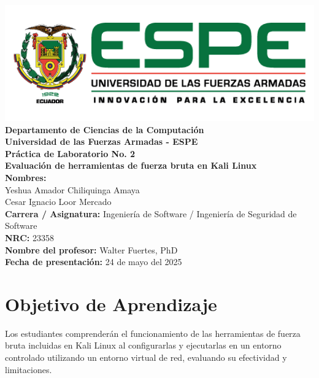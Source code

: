 \documentclass[12pt,a4paper]{article}
\begin{document}
\begin{titlepage}
    \centering
    \vspace*{1cm}
    \includegraphics[width=0.8\linewidth]{espe.png}\\[0.5cm]
    
    \Large \textbf{Departamento de Ciencias de la Computación}\\
    \large \textbf{Universidad de las Fuerzas Armadas - ESPE}\\[0.5cm]
    
    \Huge \textbf{Práctica de Laboratorio No. 2}\\[0.3cm]
    \Large \textbf{Evaluación de herramientas de fuerza bruta en Kali Linux}\\[0.8cm]
    
    \textbf{Nombres:}\\
    Yeshua Amador Chiliquinga Amaya\\
    Cesar Ignacio Loor Mercado\\[0.3cm]
    
    \textbf{Carrera / Asignatura:} Ingeniería de Software / Ingeniería de Seguridad de Software\\
    \textbf{NRC:} 23358\\
    \textbf{Nombre del profesor:} Walter Fuertes, PhD\\[0.5cm]
    
    \textbf{Fecha de presentación:} 24 de mayo del 2025\\[1cm]    
    \vfill
\end{titlepage}
\clearpage
{} %
\tableofcontents
\thispagestyle{empty}
\cleardoublepage
\setcounter{page}{1}

\section*{Objetivo de Aprendizaje}
Los estudiantes comprenderán el funcionamiento de las herramientas de fuerza bruta incluidas en Kali Linux al configurarlas y ejecutarlas en un entorno controlado utilizando un entorno virtual de red, evaluando su efectividad y limitaciones.
\end{document}
